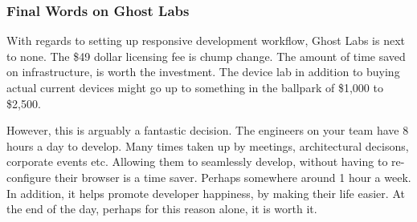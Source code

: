 \subsubsection{ Final Words on Ghost Labs }
With regards to setting up responsive development workflow, Ghost Labs is next
to none. The \$49 dollar licensing fee is chump change. The amount of time
saved on infrastructure, is worth the investment. The device lab in addition
to buying actual current devices might go up to something in the ballpark of
\$1,000 to \$2,500.

However, this is arguably a fantastic decision. The engineers on your team have
8 hours a day to develop. Many times taken up by meetings, architectural
decisons, corporate events etc. Allowing them to seamlessly develop, without
having to re-configure their browser is a time saver. Perhaps somewhere around
1 hour a week. In addition, it helps promote developer happiness, by making
their life easier. At the end of the day, perhaps for this reason alone, it is
worth it.
